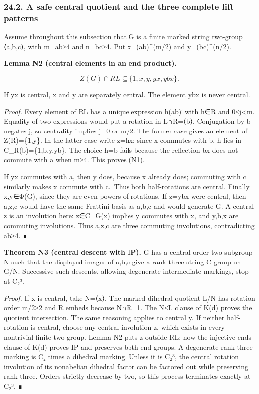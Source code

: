 \documentclass[
  10pt,
  letterpaper,
]{article}
\begin{document}
\subsubsection{24.2. A safe central quotient and the three complete lift
patterns}\label{a-safe-central-quotient-and-the-three-complete-lift-patterns}

Assume throughout this subsection that G is a finite marked string
two-group ⟨a,b,c⟩, with m=\textbar ab\textbar≥4 and
n=\textbar bc\textbar≥4. Put x=(ab)\^{}(m/2) and y=(bc)\^{}(n/2).

\textbf{Lemma N2 (central elements in an end product).}

\[
Z(G)\cap RL\subseteq\{1,x,y,yx,ybx\}.
\tag{N1}
\]

If yx is central, x and y are separately central. The element ybx is
never central.

\emph{Proof.} Every element of RL has a unique expression h(ab)ʲ with
h∈R and 0≤j\textless m. Equality of two expressions would put a rotation
in L∩R=⟨b⟩. Conjugation by b negates j, so centrality implies j=0 or
m/2. The former case gives an element of Z(R)=\{1,y\}. In the latter
case write z=hx; since x commutes with b, h lies in
C\_R(b)=\{1,b,y,yb\}. The choice h=b fails because the reflection bx
does not commute with a when m≥4. This proves (N1).

If yx commutes with a, then y does, because x already does; commuting
with c similarly makes x commute with c.~Thus both half-rotations are
central. Finally x,y∈Φ(G), since they are even powers of rotations. If
z=ybx were central, then a,z,c would have the same Frattini basis as
a,b,c and would generate G. A central z is an involution here: z∈C\_G(x)
implies y commutes with x, and y,b,x are commuting involutions. Thus
a,z,c are three commuting involutions, contradicting
\textbar ab\textbar≥4. ∎

\textbf{Theorem N3 (central descent with IP).} G has a central order-two
subgroup N such that the displayed images of a,b,c give a rank-three
string C-group on G/N. Successive such descents, allowing degenerate
intermediate markings, stop at C₂³.

\emph{Proof.} If x is central, take N=⟨x⟩. The marked dihedral quotient
L/N has rotation order m/2≥2 and R embeds because N∩R=1. The N≤L clause
of K(d) proves the quotient intersection. The same reasoning applies to
central y. If neither half-rotation is central, choose any central
involution z, which exists in every nontrivial finite two-group. Lemma
N2 puts z outside RL; now the injective-ends clause of K(d) proves IP
and preserves both end groups. A degenerate rank-three marking is C₂
times a dihedral marking. Unless it is C₂³, the central rotation
involution of its nonabelian dihedral factor can be factored out while
preserving rank three. Orders strictly decrease by two, so this process
terminates exactly at C₂³. ∎
\end{document}
